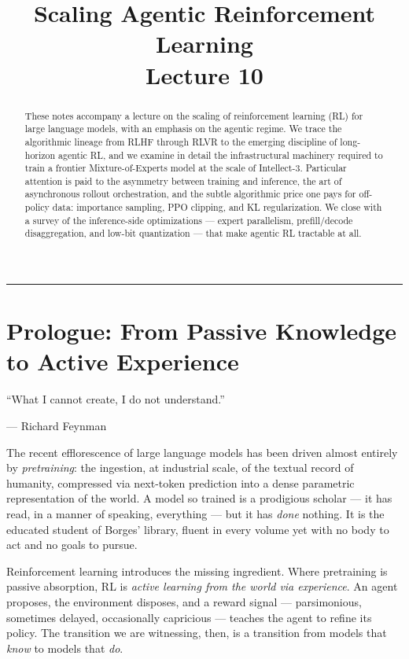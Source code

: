 \documentclass[11pt,a4paper]{article}
\title{\vspace{-1.5em}\textbf{Scaling Agentic Reinforcement Learning} \\[0.4em]
  {\large Lecture 10}}
\date{}
\theoremstyle{definition}
\theoremstyle{plain}
\begin{document}
\maketitle

\begin{abstract}
\noindent These notes accompany a lecture on the scaling of reinforcement learning (RL) for large language models, with an emphasis on the agentic regime. We trace the algorithmic lineage from RLHF through RLVR to the emerging discipline of long-horizon agentic RL, and we examine in detail the infrastructural machinery required to train a frontier Mixture-of-Experts model at the scale of Intellect-3. Particular attention is paid to the asymmetry between training and inference, the art of asynchronous rollout orchestration, and the subtle algorithmic price one pays for off-policy data: importance sampling, PPO clipping, and KL regularization. We close with a survey of the inference-side optimizations --- expert parallelism, prefill/decode disaggregation, and low-bit quantization --- that make agentic RL tractable at all.
\end{abstract}

\tableofcontents
\vspace{1em}
\hrule
\vspace{1em}

\section{Prologue: From Passive Knowledge to Active Experience}

\epigraph{``What I cannot create, I do not understand.''}{--- Richard Feynman}

The recent efflorescence of large language models has been driven almost entirely by \emph{pretraining}: the ingestion, at industrial scale, of the textual record of humanity, compressed via next-token prediction into a dense parametric representation of the world. A model so trained is a prodigious scholar --- it has read, in a manner of speaking, everything --- but it has \emph{done} nothing. It is the educated student of Borges' library, fluent in every volume yet with no body to act and no goals to pursue.

Reinforcement learning introduces the missing ingredient. Where pretraining is passive absorption, RL is \emph{active learning from the world via experience}. An agent proposes, the environment disposes, and a reward signal --- parsimonious, sometimes delayed, occasionally capricious --- teaches the agent to refine its policy. The transition we are witnessing, then, is a transition from models that \emph{know} to models that \emph{do}.
\end{document}
